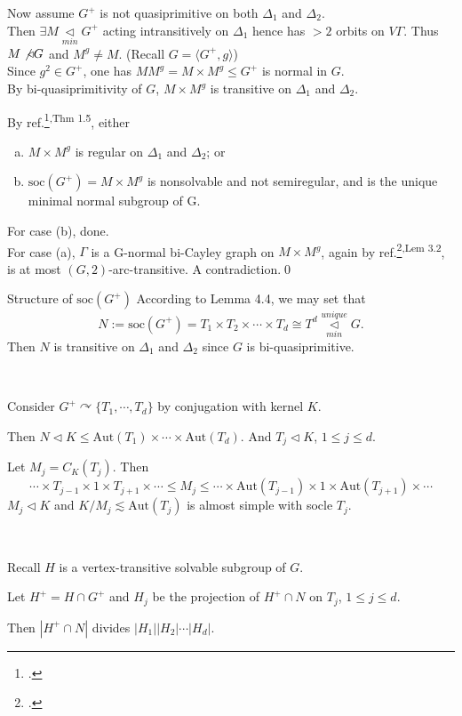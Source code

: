 \documentclass{beamer}
\def\Aut{\mathrm{Aut}}
\def\soc{\mathrm{soc}}
\begin{document}
\begin{frame}
Now assume $G^+$ is not quasiprimitive on both $\Delta_1$ and $\Delta_2$.\\ Then $\exists M\mathop{\triangleleft}\limits_{min} G^+$ acting intransitively on $\Delta_1$ hence has $> 2$ orbits on $V\Gamma$. Thus $M\not\triangleleft G$ and $M^g\neq M$. (Recall $G=\langle G^+,g\rangle$)\\Since $g^2\in G^+$, one has $MM^g=M\times M^g\leq G^+$ is normal in $G$.\\By bi-quasiprimitivity of $G$, $M\times M^g$ is transitive on $\Delta_1$ and $\Delta_2$.

By ref.\footcite{LI2002197}\textsuperscript{,Thm 1.5}, either
\begin{enumerate}[(a)]
	\item $M\times M^g$ is regular on $\Delta_1$ and $\Delta_2$; or
	\item $\soc(G^+)=M\times M^g$ is nonsolvable and not semiregular, and is the unique minimal normal subgroup of G.
\end{enumerate}
For case (b), done.\\
For case (a), $\Gamma$ is a G-normal bi-Cayley graph on $M\times M^g$, again by ref.\footcite{CONDER2020264}\textsuperscript{,Lem 3.2}, is at most $(G,2)$-arc-transitive. A contradiction.\qed 
\end{frame}


\begin{frame}{Structure of $\soc(G^+)$}
According to Lemma 4.4, we may set that
\[ N:=\soc(G^+)=T_1\times T_2\times\cdots\times T_d\cong T^d\mathop{\triangleleft}\limits_{min}^{unique} G . \]
Then $N$ is transitive on $\Delta_1$ and $\Delta_2$ since $G$ is bi-quasiprimitive.

\ 

Consider $G^+\curvearrowright \{T_1,\cdots,T_d\}$ by conjugation with kernel $K$.

Then $N\triangleleft K\leq \Aut(T_1)\times \cdots\times \Aut(T_d)$. 
And $T_j\triangleleft K$, $1\leq j\leq d$. 

Let $M_j=C_K(T_j)$. Then\[ \cdots\times T_{j-1}\times 1\times T_{j+1}\times \cdots\leq M_j\leq \cdots\times \Aut(T_{j-1})\times 1\times  \Aut(T_{j+1})\times \cdots \]
$M_j\triangleleft K$ and $K/M_j\lesssim \Aut(T_j)$ is almost simple with socle $T_j$.%

\ 

Recall $H$ is a vertex-transitive solvable subgroup of $G$. 

Let $H^+=H\cap G^+$ and $H_j$ be the projection of $H^+\cap N$ on $T_j$, $1\leq j\leq d$.

Then $|H^+\cap N|$ divides $|H_1||H_2|\cdots|H_d|$.

\end{frame}
\end{document}
